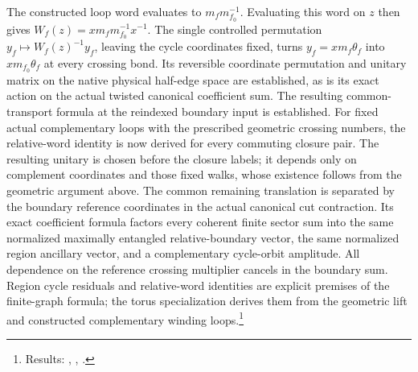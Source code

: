 \documentclass{article}
\begin{document}
The constructed loop word evaluates to
$m_fm_{f_0}^{-1}$. Evaluating this word on $z$ then gives
$W_f(z)=x m_fm_{f_0}^{-1}x^{-1}$. The single controlled permutation
$y_f\mapsto W_f(z)^{-1}y_f$, leaving the cycle coordinates fixed,
turns $y_f=xm_f\theta_f$ into $x m_{f_0}\theta_f$ at every crossing
bond. Its reversible coordinate permutation and unitary matrix on
the native physical half-edge space are established, as is its exact
action on the actual twisted canonical coefficient sum. The resulting
common-transport formula at the reindexed boundary input is established.
For fixed actual complementary loops with the prescribed geometric
crossing numbers, the relative-word identity is now derived for every
commuting closure pair. The resulting unitary is chosen before the
closure labels; it depends only on complement coordinates and those
fixed walks, whose existence follows from the geometric argument above.
The common remaining translation is separated by the boundary reference
coordinates in the actual canonical cut contraction. Its exact coefficient
formula factors every coherent finite sector sum into the same normalized
maximally entangled relative-boundary vector, the same normalized region
ancillary vector, and a complementary cycle-orbit amplitude. All dependence
on the reference crossing multiplier cancels in the boundary sum.
Region cycle residuals and relative-word identities are explicit premises
of the finite-graph formula; the torus specialization derives them from
the geometric lift and constructed complementary winding
loops.\footnote{Results:
    ,
    ,
    .}
\end{document}
